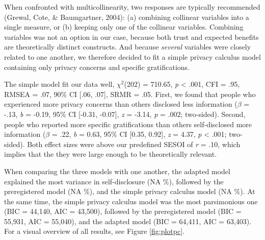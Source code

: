 \documentclass[
  english,
  man,floatsintext]{apa6}
\begin{document}
When confronted with multicollinearity, two responses are typically recommended (Grewal, Cote, \& Baumgartner, 2004):
(a) combining collinear variables into a single measure, or (b) keeping only one of the collinear variables.
Combining variables was not an option in our case, because both trust and expected benefits are theoretically distinct constructs.
And because \emph{several} variables were closely related to one another, we therefore decided to fit a simple privacy calculus model containing only privacy concerns and specific gratifications.

The simple model fit our data well, \(\chi^2\)(202) = 710.65, \emph{p} \textless{} .001, CFI = .95, RMSEA = .07, 90\% CI {[}.06, .07{]}, SRMR = .05.
First, we found that people who experienced more privacy concerns than others disclosed less information (\(\beta\) = -.13, \textit{b} = -0.19, 95\% CI {[}-0.31, -0.07{]}, \textit{z} = -3.14, \textit{p} = .002; two-sided).
Second, people who reported more specific gratifications than others self-disclosed more information (\(\beta\) = .22, \textit{b} = 0.63, 95\% CI {[}0.35, 0.92{]}, \textit{z} = 4.37, \textit{p} \textless{} .001; two-sided).
Both effect sizes were above our predefined SESOI of \emph{r} = .10, which implies that the they were large enough to be theoretically relevant.

When comparing the three models with one another, the adapted model explained the most variance in self-disclosure (NA \%), followed by the preregistered model (NA \%), and the simple privacy calculus model (NA \%).
At the same time, the simple privacy calculus model was the most parsimonious one (BIC = 44,140, AIC = 43,500), followed by the preregistered model (BIC = 55,931, AIC = 55,040), and the adapted model (BIC = 64,411, AIC = 63,403).
For a visual overview of all results, see Figure \ref{fig:plotpc}.
\end{document}
